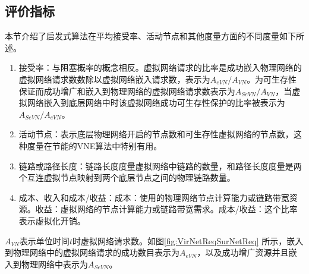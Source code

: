 \subsection{评价指标}
本节介绍了启发式算法在平均接受率、活动节点和其他度量方面的不同度量\cite{fischer2013virtual}如下所述。
\begin{enumerate}
  \item 接受率：与阻塞概率的概念相反。虚拟网络请求的比率是成功嵌入物理网络的虚拟网络请求数数除以虚拟网络嵌入请求数，表示为$A_{eVN}/A_{VN}$。为可生存性保证而成功增广和嵌入到物理网络的虚拟网络请求数表示为$A_{SeVN}/A_{VN}$，当虚拟网络嵌入到底层网络中时该虚拟网络成功可生存性保护的比率被表示为$A_{SeVN}/A_{eVN}$。
  \item 活动节点：表示底层物理网络开启的节点数和可生存性虚拟网络的节点数，这种度量在节能的VNE算法中特别有用。
  \item 链路或路径长度：链路长度度量虚拟网络中链路的数量，和路径长度度量是两个互连虚拟节点映射到两个底层节点之间的物理链路数量。
  \item 成本、收入和成本/收益：成本：使用的物理网络节点计算能力或链路带宽资源。收益：虚拟网络的节点计算能力或链路带宽需求。成本/收益：这个比率表示虚拟化开销。
\end{enumerate}


$A_{VN}$表示单位时间$t$时虚拟网络请求数。如图\ref{fig:VirNetReqSurNetReq} 所示，嵌入到物理网络中的虚拟网络请求的成功数目表示为$A_{eVN}$，以及成功增广资源并且嵌入到物理网络中表示为$A_{SeVN}$。

